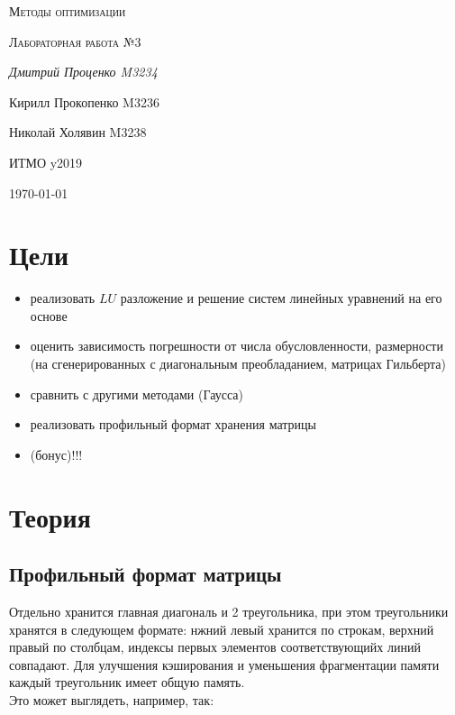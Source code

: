 \documentclass[russian, english]{article}
\begin{document}
\begin{titlepage}
\centering
	{\scshape\LARGE Методы оптимизации \par}
	\vspace{1cm}
	{\scshape\Large Лабораторная работа №3\par}
	\vspace{2cm}
	{\Large\itshape Дмитрий Проценко M3234 \par
	Кирилл Прокопенко M3236 \par
	Николай Холявин M3238 \par}
	\vfill
	ИТМО y2019
	\vfill
	{\large \today\par}
\end{titlepage}

\tableofcontents
\newpage

\section{Цели}
\begin{itemize}
	\item реализовать $LU$ разложение и решение систем линейных уравнений на его основе
	\item оценить зависимость погрешности от числа обусловленности, размерности (на сгенерированных с диагональным преобладанием, матрицах Гильберта)
	\item сравнить с другими методами (Гаусса)
	\item реализовать профильный формат хранения матрицы
	\item (бонус)!!!
\end{itemize}
\section{Теория}
\subsection{Профильный формат матрицы}
Отдельно хранится главная диагональ и 2 треугольника, при этом треугольники хранятся в следующем формате: нжний левый хранится по строкам, верхний правый по столбцам, индексы первых элементов соответствующийх линий совпадают. Для улучшения кэширования и уменьшения фрагментации памяти каждый треугольник имеет общую память.\\
Это может выглядеть, например, так:

\newcommand*{\GridSize}{8}

\newcommand*{\ColorCells}[1]{%
	\foreach \x/\y/\color in {#1} {
		\node [fill=\color, draw=none, thick, minimum size=1cm] 
			at (\x-.5,\GridSize+0.5-\y) {};
	}
}
\end{document}
